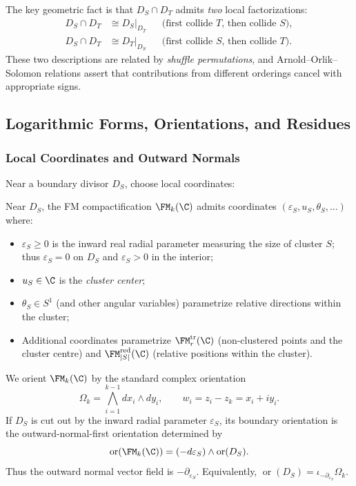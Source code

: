 The key geometric fact is that $D_S \cap D_T$ admits \emph{two} local factorizations:
\begin{align}
D_S \cap D_T &\cong D_S|_{D_T} && \text{(first collide $T$, then collide $S$)}, \\
D_S \cap D_T &\cong D_T|_{D_S} && \text{(first collide $S$, then collide $T$)}.
\end{align}
These two descriptions are related by \emph{shuffle permutations}, and Arnold--Orlik--Solomon relations assert that contributions from different orderings cancel with appropriate signs.

\subsection{Logarithmic Forms, Orientations, and Residues}

\subsubsection{Local Coordinates and Outward Normals}

Near a boundary divisor $D_S$, choose local coordinates:

\begin{definition}
\label{def:FM_coords}
Near $D_S$, the FM compactification $\FM_k(\C)$ admits coordinates $(\varepsilon_S, u_S, \theta_S, \ldots)$ where:
\begin{itemize}
\item $\varepsilon_S \geq 0$ is the inward real radial parameter
measuring the size of cluster $S$; thus
$\varepsilon_S = 0$ on $D_S$ and $\varepsilon_S>0$ in the interior;
\item $u_S \in \C$ is the \emph{cluster center};
\item $\theta_S \in S^1$ (and other angular variables) parametrize relative directions within the cluster;
\item Additional coordinates parametrize
\(\FM_r^{\mathrm{tr}}(\C)\) (non-clustered points and the cluster
centre) and \(\FM_{|S|}^{\mathrm{red}}(\C)\) (relative positions
within the cluster).
\end{itemize}
\end{definition}

\begin{definition}
\label{def:orientation}
We orient $\FM_k(\C)$ by the standard complex orientation
\[
\Omega_k=\bigwedge_{i=1}^{k-1} dx_i\wedge dy_i,\qquad
w_i=z_i-z_k=x_i+iy_i.
\]
If \(D_S\) is cut out by the inward radial parameter
\(\varepsilon_S\), its boundary orientation is the
outward-normal-first orientation determined by
\[
\operatorname{or}(\FM_k(\C))
=(-d\varepsilon_S)\wedge \operatorname{or}(D_S).
\]
Thus the outward normal vector field is
\(-\partial_{\varepsilon_S}\).  Equivalently,
\(\operatorname{or}(D_S)=\iota_{-\partial_{\varepsilon_S}}\Omega_k\).
\end{definition}

